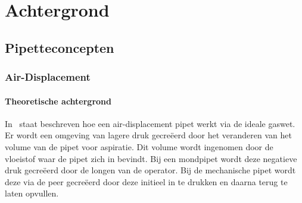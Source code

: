 \chapter{Achtergrond}


\section{Pipetteconcepten}
\subsection{Air-Displacement}
\subsubsection{Theoretische achtergrond}
In\ \cite{RN15} staat beschreven hoe een air-displacement pipet werkt via de ideale gaswet. Er wordt een omgeving van lagere druk gecreëerd door het veranderen van het volume van de pipet voor aspiratie. Dit volume wordt ingenomen door de vloeistof waar de pipet zich in bevindt. Bij een mondpipet wordt deze negatieve druk gecreëerd door de longen van de operator. Bij de mechanische pipet wordt deze via de peer gecreëerd door deze initieel in te drukken en daarna terug te laten opvullen.
